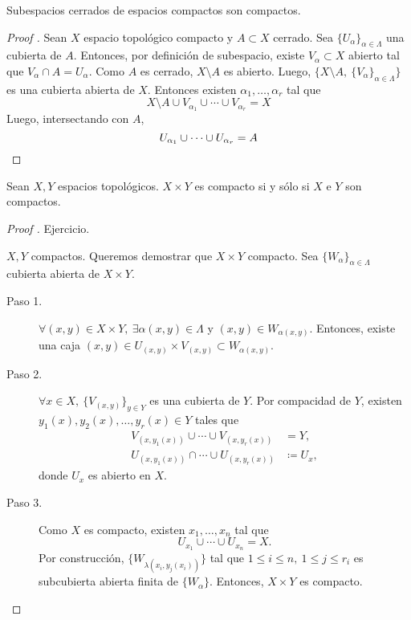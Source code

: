 
\begin{prop}
	Subespacios cerrados de espacios compactos son compactos.
\end{prop}
\begin{proof}[Proof ]
	Sean $X$ espacio topológico compacto y $A \subset X$ cerrado. Sea $\{U_\alpha\}_{\alpha \in \Lambda}$ una cubierta de $A$. Entonces, por definición de subespacio, existe $V_\alpha \subset X$ abierto tal que $V_\alpha \cap A = U_\alpha$. Como $A$ es cerrado, $X \setminus A$ es abierto. Luego, $\{ X \setminus A,\ \{V_\alpha\}_{\alpha\in\Lambda}\}$  es una cubierta abierta de $X$. Entonces existen $\alpha_{1},\dots,\alpha_{r}$ tal que
	\[ X \setminus A \cup V_{\alpha_{1}} \cup \cdots \cup V_{\alpha_{r}} = X \]
	Luego, intersectando con $A$,
	\[ U_{\alpha_{1}} \cup \cdots \cup U_{\alpha_{r}} = A \qedhere \]
\end{proof}

\begin{prop}
	Sean $X,Y$ espacios topológicos. $X \times Y$ es compacto si y sólo si $X$ e $Y$ son compactos.
\end{prop}
\begin{proof}[Proof ]
	\fbox{$\Rightarrow$} Ejercicio. \par
	\medskip
	\fbox{$\Leftarrow$} $X, Y$ compactos. Queremos demostrar que $X \times Y$ compacto. Sea $\{W_{\alpha}\}_{\alpha\in\Lambda}$ cubierta abierta de $X \times Y$.
	\begin{description}
		\item[Paso 1.] $\forall (x,y) \in X \times Y,\ \exists \alpha(x,y) \in \Lambda$ y $(x,y) \in W_{\alpha(x,y)}$. Entonces, existe una caja $(x,y) \in U_{(x,y)} \times V_{(x,y)} \subset W_{\alpha(x,y)}$.

		\item[Paso 2.] $\forall x \in X,\ \{V_{(x,y)}\}_{y \in Y}$ es una cubierta de $Y$. Por compacidad de $Y$, existen $y_{1}(x), y_{2}(x),\dots,y_{r}(x) \in Y$ tales que
		\begin{align*}
			V_{(x,y_{1}(x))} \cup \cdots \cup V_{(x,y_{r}(x))} &= Y, \\
			U_{(x,y_{1}(x))} \cap \cdots \cup U_{(x,y_{r}(x))} &\coloneq U_{x}
		,\end{align*}
		donde $U_x$ es abierto en $X$.

		\item[Paso 3.] Como $X$ es compacto, existen $x_{1},\dots, x_{n}$ tal que
		\[ U_{x_{1}} \cup \cdots \cup U_{x_{n}} = X. \]
		Por construcción, $\{W_{\lambda(x_{i}, y_{j}(x_{i}))}\}$ tal que $1 \leq i \leq n,\ 1 \leq j \leq r_{i}$ es subcubierta abierta finita de $\{W_{\alpha}\}$. Entonces, $X \times Y$ es compacto. \qedhere
	\end{description}
\end{proof}

